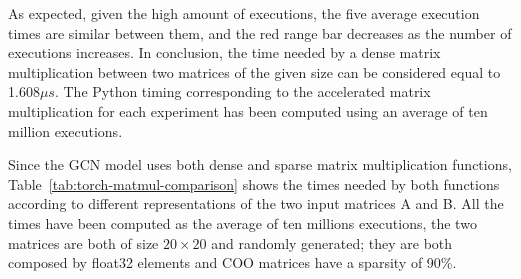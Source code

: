 As expected, given the high amount of executions, the five average execution times are similar between them, and the red range bar decreases as the number of executions increases.
In conclusion, the time needed by a dense matrix multiplication between two matrices of the given size can be considered equal to 1.608$\mu s$.
The Python timing corresponding to the accelerated matrix multiplication for each experiment has been computed using an average of ten million executions.

Since the GCN model uses both dense and sparse matrix multiplication functions, Table~\ref{tab:torch-matmul-comparison} shows the times needed by both functions according to different representations of the two input matrices A and B\@.
All the times have been computed as the average of ten millions executions, the two matrices are both of size $20 \times 20$ and randomly generated; they are both composed by float32 elements and COO matrices have a sparsity of 90\%.

